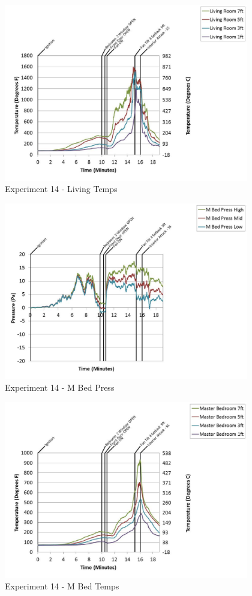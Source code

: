 \documentclass{article}
\begin{document}
\begin{appendices}
	\begin{figure}[h!]
		\centering
		\includegraphics[height=3.05in]{0_Images/Results_Charts/Exp_14_Charts/LivingTemps.pdf}
		\caption{Experiment 14 - Living Temps}
	\end{figure}
 
	\clearpage

	\begin{figure}[h!]
		\centering
		\includegraphics[height=3.05in]{0_Images/Results_Charts/Exp_14_Charts/MBedPress.pdf}
		\caption{Experiment 14 - M Bed Press}
	\end{figure}
 

	\begin{figure}[h!]
		\centering
		\includegraphics[height=3.05in]{0_Images/Results_Charts/Exp_14_Charts/MBedTemps.pdf}
		\caption{Experiment 14 - M Bed Temps}
	\end{figure}
 

\end{appendices}
\end{document}

